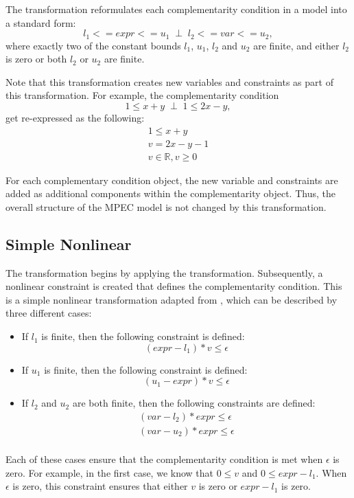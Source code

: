 The  transformation reformulates each
complementarity condition in a model into a standard form:
\[
{l}_1 <= expr <= {u}_1 \;\;\bot\;\; {l}_2 <= var <= {u}_2,
\]
where exactly two of the constant bounds $l_1$, $u_1$, $l_2$ and
$u_2$ are finite, and either $l_2$ is zero or both $l_2$ or $u_2$ are finite.

Note that this transformation creates new variables and constraints
as part of this transformation.  For example, the complementarity
condition
\[
1 \leq x + y \;\;\bot\;\; 1 \leq 2x - y,
\]
get re-expressed as the following:
\[
\begin{array}{l}
1 \leq x + y\\
v = 2x - y - 1\\
v \in \mathbb{R}, v \ge 0
\end{array}
\]

For each complementary condition object, the new variable and
constraints are added as additional components within the
complementarity object.  Thus, the overall structure of the MPEC model
is not changed by this transformation.

\subsection{Simple Nonlinear}

The  transformation begins by applying
the  transformation.  Subsequently, a
nonlinear constraint is created that defines the complementarity
condition.  This is a simple nonlinear transformation adapted from
\citet{FerDirMee05}, which can be described by three different
cases:
\begin{itemize}

\item If $l_1$ is finite, then the following constraint is defined:
\[
    (expr - l_1) * v \leq \epsilon
\]

\item If $u_1$ is finite, then the following constraint is defined:
\[
    (u_1 - expr) * v \leq \epsilon
\]

\item If $l_2$ and $u_2$ are both finite, then the following constraints are defined:
\[
\begin{array}{l}
(var - l_2) * expr \leq \epsilon\\
(var - u_2) * expr \leq \epsilon\\
\end{array}
\]

\end{itemize}
Each of these cases ensure that the complementarity condition is
met when $\epsilon$ is zero.  For example, in the first case, we
know that $0 \leq v$ and $0 \leq expr - l_1$.  When $\epsilon$ is
zero, this constraint ensures that either $v$ is zero or $expr -
l_1$ is zero.

